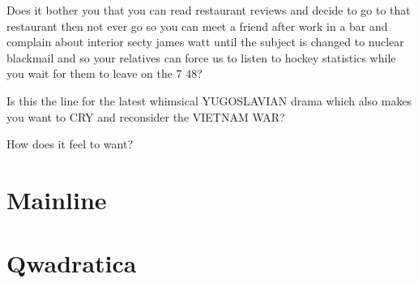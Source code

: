 \documentclass[cropmarks, frame, english]{idamasterthesis}
\begin{document}
Does it bother you that you can read restaurant reviews and decide to
go to that restaurant then not ever go so you can meet a friend after
work in a bar and complain about interior secty james watt until the
subject is changed to nuclear blackmail and so your relatives can
force us to listen to hockey statistics while you wait for them to
leave on the 7 48?

Is this the line for the latest whimsical YUGOSLAVIAN drama which also
 makes you want to CRY and reconsider the VIETNAM WAR?

How does it feel to want?

\section{Mainline}

\section{Qwadratica}
\end{document}

